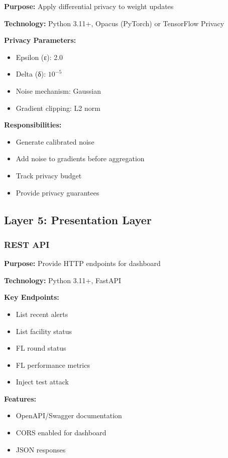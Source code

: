 \documentclass[12pt,a4paper]{article}
\begin{document}
\textbf{Purpose:} Apply differential privacy to weight updates

\textbf{Technology:} Python 3.11+, Opacus (PyTorch) or TensorFlow Privacy

\textbf{Privacy Parameters:}
\begin{itemize}[leftmargin=1cm,itemsep=0pt]
    \item Epsilon (ε): 2.0
    \item Delta (δ): $10^{-5}$
    \item Noise mechanism: Gaussian
    \item Gradient clipping: L2 norm
\end{itemize}

\textbf{Responsibilities:}
\begin{itemize}[leftmargin=1cm,itemsep=0pt]
    \item Generate calibrated noise
    \item Add noise to gradients before aggregation
    \item Track privacy budget
    \item Provide privacy guarantees
\end{itemize}


\subsection{Layer 5: Presentation Layer}

\subsubsection{REST API}

\textbf{Purpose:} Provide HTTP endpoints for dashboard

\textbf{Technology:} Python 3.11+, FastAPI

\textbf{Key Endpoints:}
\begin{itemize}[leftmargin=1cm,itemsep=0pt]
    \item List recent alerts
    \item List facility status
    \item FL round status
    \item FL performance metrics
    \item Inject test attack
\end{itemize}

\textbf{Features:}
\begin{itemize}[leftmargin=1cm,itemsep=0pt]
    \item OpenAPI/Swagger documentation
    \item CORS enabled for dashboard
    \item JSON responses
\end{itemize}
\end{document}
